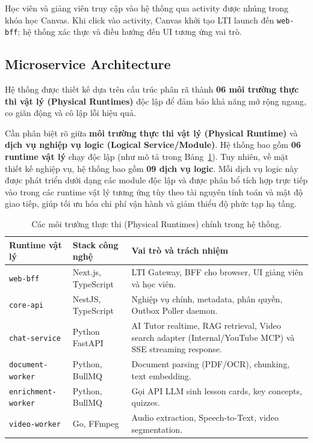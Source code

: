 Học viên và giảng viên truy cập vào hệ thống qua activity được nhúng trong
khóa học Canvas. Khi click vào activity, Canvas khởi tạo LTI launch đến
\texttt{web-bff}; hệ thống xác thực và điều hướng đến UI tương ứng vai trò.

\subsection{Microservice Architecture}

Hệ thống được thiết kế dựa trên cấu trúc phân rã thành \textbf{06 môi trường thực thi vật lý (Physical Runtimes)} độc lập để đảm bảo khả năng mở rộng ngang, co giãn động và cô lập lỗi hiệu quả.

Cần phân biệt rõ giữa \textbf{môi trường thực thi vật lý (Physical Runtime)} và \textbf{dịch vụ nghiệp vụ logic (Logical Service/Module)}. Hệ thống bao gồm \textbf{06 runtime vật lý} chạy độc lập (như mô tả trong Bảng~\ref{tab:runtimes}). Tuy nhiên, về mặt thiết kế nghiệp vụ, hệ thống bao gồm \textbf{09 dịch vụ logic}. Mỗi dịch vụ logic này được phát triển dưới dạng các module độc lập và được phân bổ tích hợp trực tiếp vào trong các runtime vật lý tương ứng tùy theo tài nguyên tính toán và mật độ giao tiếp, giúp tối ưu hóa chi phí vận hành và giảm thiểu độ phức tạp hạ tầng.

\begin{table}[H]
    \centering
    \caption{Các môi trường thực thi (Physical Runtimes) chính trong hệ thống.}
    \label{tab:runtimes}
    \begin{tabular}{|p{4.4cm}|p{3cm}|p{6.6cm}|}
        \hline
        \textbf{Runtime vật lý} & \textbf{Stack công nghệ} & \textbf{Vai trò và trách nhiệm} \\
        \hline
        \texttt{web-bff}
            & Next.js, TypeScript
            & LTI Gateway, BFF cho browser, UI giảng viên và học viên. \\
        \hline
        \texttt{core-api}
            & NestJS, TypeScript
            & Nghiệp vụ chính, metadata, phân quyền, Outbox Poller daemon. \\
        \hline
        \texttt{chat-service}
            & Python FastAPI
            & AI Tutor realtime, RAG retrieval, Video search adapter (Internal/YouTube MCP) và SSE streaming response. \\
        \hline
        \texttt{document-worker}
            & Python, BullMQ
            & Document parsing (PDF/OCR), chunking, text embedding. \\
        \hline
        \texttt{enrichment-worker}
            & Python, BullMQ
            & Gọi API LLM sinh lesson cards, key concepts, quizzes. \\
        \hline
        \texttt{video-worker}
            & Go, FFmpeg
            & Audio extraction, Speech-to-Text, video segmentation. \\
        \hline
    \end{tabular}
\end{table}

